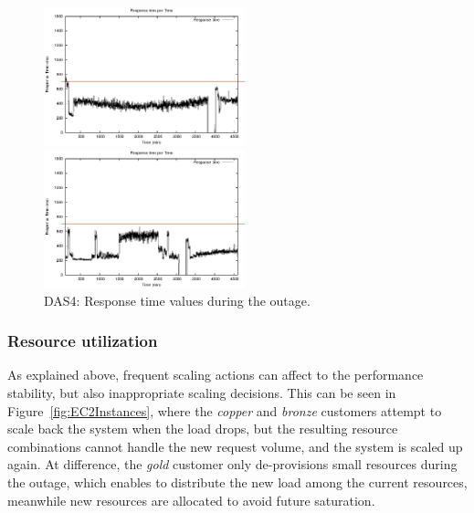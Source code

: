 \begin{figure}[htb]
\begin{minipage}[b]{0.2\linewidth}
		\vspace{-4mm}
		\includegraphics[width=\linewidth,height=4cm]{images/exps2011/medium_up/das/proxyDataPoints_output.eps}
		\vspace{-4mm}
	\end{minipage}
\hfill
\begin{minipage}[b]{0.19\linewidth}
		\vspace{-4mm}
		\includegraphics[width=\linewidth,height=4cm]{images/exps2011/high/das/proxyDataPoints_output.eps}
		\vspace{-4mm}
	\end{minipage}
\caption{DAS4: Response time values during the outage.}
\label{fig:DAS4ResponseTime}
\end{figure}


\subsubsection{Resource utilization}

As explained above, frequent scaling actions can affect to the performance stability, but also inappropriate scaling decisions. This can be seen in Figure~\ref{fig:EC2Instances}, where the \emph{copper} and \emph{bronze} customers attempt to scale back the system when the load drops, but the resulting resource combinations cannot handle the new request volume, and the system is scaled up again.  At difference, the \emph{gold} customer only de-provisions small resources during the outage, which enables to distribute the new load among the current resources, meanwhile new resources are allocated to avoid future saturation. 

